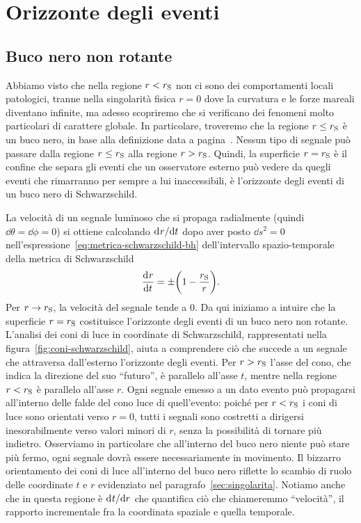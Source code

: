 \section{Orizzonte degli eventi}
\label{sec:orizzonte-eventi}

\subsection{Buco nero non rotante}
\label{sec:orizzonte-schwarzschild}

Abbiamo visto che nella regione \(r < r_{\textup{S}}\) non ci sono dei
comportamenti locali patologici, tranne nella singolarità fisica \(r = 0\) dove
la curvatura e le forze mareali diventano infinite, ma adesso scopriremo che si
verificano dei fenomeni molto particolari di carattere globale.  In particolare,
troveremo che la regione \(r \leq r_{\textup{S}}\) è un buco nero, in base alla
definizione data a pagina~\pageref{definizione-buco-nero}.  Nessun tipo di
segnale può passare dalla regione \(r\leq r_{\textup{S}}\) alla regione \(r >
r_{\textup{S}}\).  Quindi, la superficie \(r = r_{\textup{S}}\) è il confine che
separa gli eventi che un osservatore esterno può vedere da quegli eventi che
rimarranno per sempre a lui inaccessibili, è l'orizzonte degli eventi di un buco
nero di Schwarzschild.

La velocità di un segnale luminoso che si propaga radialmente (quindi
\(\dd\theta = \dd\phi = 0\)) si ottiene calcolando \(\mathrm{d}^{}r / \mathrm{d} {t}^{}\) dopo aver
posto \(\dd s^{2} = 0\) nell'espressione~\eqref{eq:metrica-schwarzschild-bh}
dell'intervallo spazio-temporale della metrica di Schwarzschild
\begin{equation}
  \frac{{\mathop{}\!\mathrm{d}^{}}r}{\mathop{}\!\mathrm{d} {t}^{}} = \pm \biggl(1 - \frac{r_{\textup{S}}}{r}\biggr).
\end{equation}
Per \(r \to r_{\textup{S}}\), la velocità del segnale tende a \(0\).  Da qui
iniziamo a intuire che la superficie \(r = r_{\textup{S}}\) costituisce
l'orizzonte degli eventi di un buco nero non rotante.  L'analisi dei coni di
luce in coordinate di Schwarzschild, rappresentati nella
figura~\ref{fig:coni-schwarzschild}, aiuta a comprendere ciò che succede a un
segnale che attraversa dall'esterno l'orizzonte degli eventi.  Per \(r >
r_{\textup{S}}\) l'asse del cono, che indica la direzione del suo ``futuro'', è
parallelo all'asse \(t\), mentre nella regione \(r < r_{\textup{S}}\) è
parallelo all'asse \(r\).  Ogni segnale emesso a un dato evento può propagarsi
all'interno delle falde del cono luce di quell'evento: poiché per \(r <
r_{\textup{S}}\) i coni di luce sono orientati verso \(r = 0\), tutti i segnali
sono costretti a dirigersi inesorabilmente verso valori minori di \(r\), senza
la possibilità di tornare più indietro.  Osserviamo in particolare che
all'interno del buco nero niente può stare più fermo, ogni segnale dovrà essere
necessariamente in movimento.  Il bizzarro orientamento dei coni di luce
all'interno del buco nero riflette lo scambio di ruolo delle coordinate \(t\) e
\(r\) evidenziato nel paragrafo~\ref{sec:singolarita}.  Notiamo anche che in
questa regione è \(\mathrm{d}^{}t / \mathrm{d} {r}^{}\) che quantifica ciò che chiameremmo
``velocità'', il rapporto incrementale fra la coordinata spaziale e quella
temporale.

